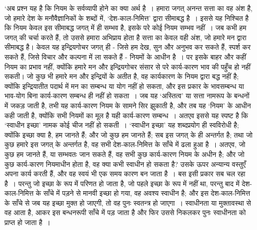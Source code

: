 ‘अब प्रश्न यह है कि नियम के सर्वव्यापी होने का क्या अर्थ है~। हमारा जगत् अनन्त सत्ता का वह अंश है, जो हमारे देश के मनौवैज्ञानिकों के शब्दों में, ‘देश-काल-निमित्त’ द्वारा सीमाबद्ध है~। इससे यह निश्चित है कि नियम केवल इस सीमाबद्ध जगत् में ही सम्भव है, इसके परे कोई नियम सम्भव नहीं~। जब कभी हम जगत् की चर्चा करते हैं, तो उससे हमारा अभिप्राय होता है सत्ता का केवल वही अंश, जो हमारे मन द्वारा सीमाबद्ध है। केवल यह इन्द्रियगोचर जगत् ही - जिसे हम देख, सुन और अनुभव कर सकते हैं, स्पर्श कर सकते हैं, जिसे विचार और कल्पना में ला सकते हैं - नियमों के आधीन है~। पर इसके बाहर और कहीं नियम का प्रभाव नहीं, क्योंकि हमारे मन और इन्द्रियगोचर संसार से परे कार्य-कारण भाव की पहुँच हो नहीं सकती। जो कुछ भी हमारे मन और इन्द्रियों के अतीत है, वह कार्यकारण के नियम द्वारा बद्ध नहीं है; क्योंकि इन्द्रियातीत पदार्थ में मन का सम्बन्ध या योग नहीं हो सकता, और इस प्रकार के भावसम्बन्ध या भाव-योग बिना कार्य-कारण सम्बन्ध ही नहीं हो सकता~। जब यह ‘अस्तित्व’ या सत्ता नामरूप के बन्धनों में जकड़ जाती है, तभी यह कार्य-कारण नियम के सामने सिर झुकाती है, और तब यह ‘नियम’ के आधीन कही जाती है, क्योंकि सभी नियमों का मूल है यही कार्य-कारण सम्बन्ध~। अतएव इससे यह स्पष्ट है कि ‘स्वाधीन इच्छा’ नामक कोई चीज नहीं हो सकती~। ‘स्वाधीन इच्छा’ यह शब्दप्रयोग ही स्वविरोधी है; क्योंकि इच्छा क्या है, हम जानते हैं; और जो कुछ हम जानते हैं; सब इस जगत् के ही अन्तर्गत है; तथा जो कुछ हमारे इस जगत् के अन्तर्गत है, वह सभी देश-काल-निमित्त के साँचे में ढला हुआ है~। अतएव, जो कुछ हम जानते हैं, या सम्भवतः जान सकते हैं, वह सभी कुछ कार्य-कारण नियम के अधीन है; और जो कुछ कार्य-कारण नियमाधीन होता है, वह क्या कभी स्वाधीन हो सकता है? उसके ऊपर अन्यान्य वस्तुएँ अपना कार्य करती हैं, और वह स्वयं भी एक समय कारण बन जाता है~। बस इसी प्रकार सब चल रहा है~। परन्तु जो इच्छा के रूप में परिणत हो जाता है, जो पहले इच्छा के रूप में नहीं था, परन्तु बाद में देश-काल-निमित्त के साँचे में पड़ने से मानवी इच्छा हो गया, वह अवश्य स्वाधीन है; और इस देश-काल-निमित्त के साँचे से जब यह इच्छा मुक्त हो जाएगी, तो वह पुनः स्वतन्त्र हो जाएगा~। स्वाधीनता या मुक्तावस्था से वह आता है, आकर इस बन्धनरूपी साँचे में पड़ जाता है और फिर उससे निकलकर पुनः स्वाधीनता को प्राप्त हो जाता है~।

